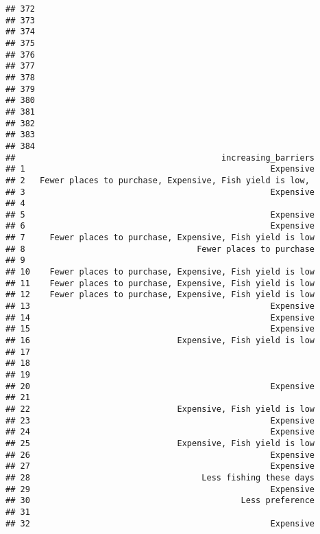 \documentclass[
]{article}
\begin{document}
\begin{verbatim}
## 372                                   
## 373                                   
## 374                                   
## 375                                   
## 376                                   
## 377                                   
## 378                                   
## 379                                   
## 380                                   
## 381                                   
## 382                                   
## 383                                   
## 384                                   
##                                          increasing_barriers
## 1                                                  Expensive
## 2   Fewer places to purchase, Expensive, Fish yield is low, 
## 3                                                  Expensive
## 4                                                           
## 5                                                  Expensive
## 6                                                  Expensive
## 7     Fewer places to purchase, Expensive, Fish yield is low
## 8                                   Fewer places to purchase
## 9                                                           
## 10    Fewer places to purchase, Expensive, Fish yield is low
## 11    Fewer places to purchase, Expensive, Fish yield is low
## 12    Fewer places to purchase, Expensive, Fish yield is low
## 13                                                 Expensive
## 14                                                 Expensive
## 15                                                 Expensive
## 16                              Expensive, Fish yield is low
## 17                                                          
## 18                                                          
## 19                                                          
## 20                                                 Expensive
## 21                                                          
## 22                              Expensive, Fish yield is low
## 23                                                 Expensive
## 24                                                 Expensive
## 25                              Expensive, Fish yield is low
## 26                                                 Expensive
## 27                                                 Expensive
## 28                                   Less fishing these days
## 29                                                 Expensive
## 30                                           Less preference
## 31                                                          
## 32                                                 Expensive

\end{verbatim}
\end{document}
